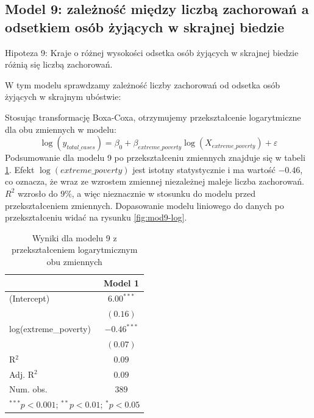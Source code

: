 \documentclass[12pt]{mwbk}
\theoremstyle{plain}
\theoremstyle{definition}
\theoremstyle{remark}
\begin{document}
\subsection{Model 9: zależność między liczbą zachorowań a odsetkiem osób żyjących w skrajnej biedzie}

Hipoteza 9: Kraje o różnej wysokości odsetka osób żyjących w skrajnej biedzie różnią się liczbą zachorowań.

W tym modelu sprawdzamy zależność liczby zachorowań od odsetka osób żyjących w skrajnym ubóstwie:



Stosując transformację Boxa-Coxa, otrzymujemy przekształcenie logarytmiczne dla obu zmiennych w modelu:
$$\log(y_{total\_cases})=\beta_0+\beta_{extreme\_poverty}\log(X_{extreme\_poverty})+\varepsilon$$
Podsumowanie dla modelu 9 po przekształceniu zmiennych znajduje się w tabeli \ref{table:mod9-log}. Efekt $\log(extreme\_poverty)$ jest istotny statystycznie i ma wartość $-0.46$, co oznacza, że wraz ze wzrostem zmiennej niezależnej maleje liczba zachorowań. $R^2$ wzrosło do $9\%$, a więc nieznacznie w stosunku do modelu przed przekształceniem zmiennych. Dopasowanie modelu liniowego do danych po przekształceniu widać na rysunku \ref{fig:mod9-log}.

\begin{table}[!htbp]
	\begin{center}
		\begin{tabular}{l c}
			\hline
			& Model 1 \\
			\hline
			(Intercept)           & $6.00^{***}$  \\
			& $(0.16)$      \\
			log(extreme\_poverty) & $-0.46^{***}$ \\
			& $(0.07)$      \\
			\hline
			R$^2$                 & $0.09$        \\
			Adj. R$^2$            & $0.09$        \\
			Num. obs.             & $389$         \\
			\hline
			\multicolumn{2}{l}{\scriptsize{$^{***}p<0.001$; $^{**}p<0.01$; $^{*}p<0.05$}}
		\end{tabular}
		\caption{Wyniki dla modelu 9 z przekształceniem logarytmicznym obu zmiennych}
		\label{table:mod9-log}
	\end{center}
\end{table}
\end{document}
